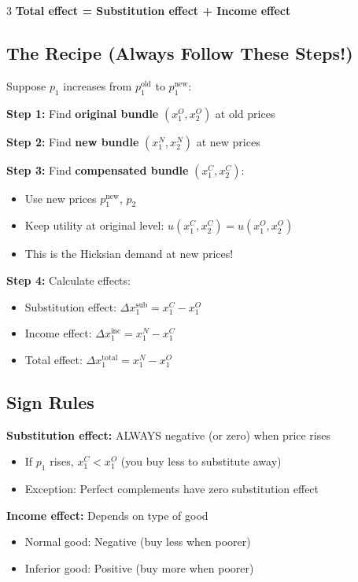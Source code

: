 \documentclass[10pt,landscape]{article}
\begin{document}
\begin{multicols}{3}
\textbf{Total effect = Substitution effect + Income effect}

\subsection{The Recipe (Always Follow These Steps!)}
Suppose $p_1$ increases from $p_1^{\text{old}}$ to $p_1^{\text{new}}$:

\textbf{Step 1:} Find \textbf{original bundle} $(x_1^O, x_2^O)$ at old prices

\textbf{Step 2:} Find \textbf{new bundle} $(x_1^N, x_2^N)$ at new prices

\textbf{Step 3:} Find \textbf{compensated bundle} $(x_1^C, x_2^C)$:
\begin{itemize}[leftmargin=*,noitemsep,topsep=0pt]
\item Use new prices $p_1^{\text{new}}$, $p_2$
\item Keep utility at original level: $u(x_1^C, x_2^C) = u(x_1^O, x_2^O)$
\item This is the Hicksian demand at new prices!
\end{itemize}

\textbf{Step 4:} Calculate effects:
\begin{itemize}[leftmargin=*,noitemsep,topsep=0pt]
\item Substitution effect: $\Delta x_1^{\text{sub}} = x_1^C - x_1^O$
\item Income effect: $\Delta x_1^{\text{inc}} = x_1^N - x_1^C$
\item Total effect: $\Delta x_1^{\text{total}} = x_1^N - x_1^O$
\end{itemize}

\subsection{Sign Rules}
\textbf{Substitution effect:} ALWAYS negative (or zero) when price rises
\begin{itemize}[leftmargin=*,noitemsep,topsep=0pt]
\item If $p_1$ rises, $x_1^C < x_1^O$ (you buy less to substitute away)
\item Exception: Perfect complements have zero substitution effect
\end{itemize}

\textbf{Income effect:} Depends on type of good
\begin{itemize}[leftmargin=*,noitemsep,topsep=0pt]
\item Normal good: Negative (buy less when poorer)
\item Inferior good: Positive (buy more when poorer)
\end{itemize}


\end{multicols}
\end{document}
